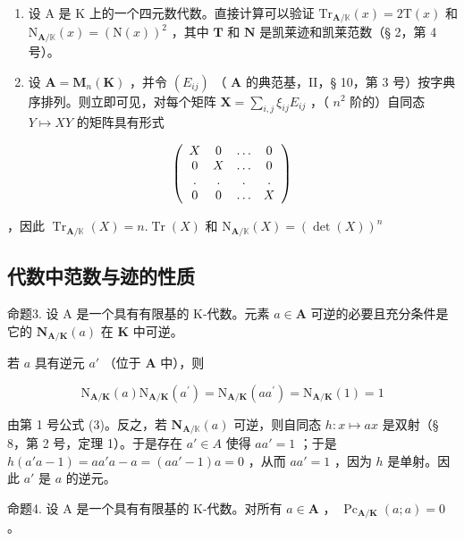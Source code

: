 \begin{enumerate}
\def\labelenumi{(\arabic{enumi})}
\setcounter{enumi}{1}
\item
  设 A 是 K 上的一个四元数代数。直接计算可以验证 \(\mathrm{Tr}_{\mathbf{A} / \mathbb{K}}(x) = 2\mathrm{T}(x)\) 和 \(\mathrm{N}_{\mathbf{A} / \mathbb{K}}(x) = (\mathrm{N}(x))^2\) ，其中 \(\mathbf{T}\) 和 \(\mathbf{N}\) 是凯莱迹和凯莱范数（§ 2，第 4 号）。
\item
  设 \(\mathbf{A} = \mathbf{M}_n(\mathbf{K})\) ，并令 \((E_{ij})\) （ \(\mathbf{A}\) 的典范基，II，§ 10，第 3 号）按字典序排列。则立即可见，对每个矩阵 \(\mathbf{X} = \sum_{i,j} \xi_{ij} E_{ij}\) ，（ \(n^2\) 阶的）自同态 \(Y \mapsto XY\) 的矩阵具有形式
\end{enumerate}

\[
\left( \begin{array}{c c c c} X & 0 & \ldots & 0 \\ 0 & X & \ldots & 0 \\ . & . & . & . \\ 0 & 0 & \ldots & X \end{array} \right)
\]

，因此 \(\operatorname{Tr}_{\mathbf{A} / \mathbb{K}}(X) = n.\operatorname{Tr}(X)\) 和 \(\mathrm{N}_{\mathbf{A} / \mathbb{K}}(X) = (\det (X))^n\)

\subsection{代数中范数与迹的性质}

命题3. 设 A 是一个具有有限基的 K-代数。元素 \(a \in \mathbf{A}\) 可逆的必要且充分条件是它的 \(\mathbf{N}_{\mathbf{A} / \mathbf{K}}(a)\) 在 \(\mathbf{K}\) 中可逆。

若 \(a\) 具有逆元 \(a'\) （位于 \(\mathbf{A}\) 中），则

\[
\mathrm{N} _ {\mathbf {A} / \mathbf {K}} (a) \mathrm{N} _ {\mathbf {A} / \mathbf {K}} (a ^ {\prime}) = \mathrm{N} _ {\mathbf {A} / \mathbf {K}} (a a ^ {\prime}) = \mathrm{N} _ {\mathbf {A} / \mathbf {K}} (1) = 1
\]

由第 1 号公式 (3)。反之，若 \(\mathbf{N}_{\mathbf{A} / \mathbb{K}}(a)\) 可逆，则自同态 \(h: x \mapsto ax\) 是双射（§ 8，第 2 号，定理 1）。于是存在 \(a' \in A\) 使得 \(aa' = 1\) ；于是 \(h(a'a - 1) = aa'a - a = (aa' - 1)a = 0\) ，从而 \(aa' = 1\) ，因为 \(h\) 是单射。因此 \(a'\) 是 \(a\) 的逆元。

命题4. 设 A 是一个具有有限基的 K-代数。对所有 \(a \in \mathbf{A}\) ， \(\operatorname{Pc}_{\mathbf{A} / \mathbf{K}}(a; a) = 0\) 。

